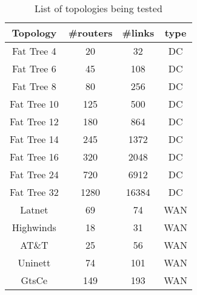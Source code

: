\begin{table}[h]
    \begin{tabular}{| c | c | c | c |}
    \hline
    Topology & \#routers & \#links & type \\
    \hline
    Fat Tree 4 & 20 & 32 & DC \\
    Fat Tree 6 & 45 & 108 & DC \\
    Fat Tree 8 & 80 & 256 & DC \\
    Fat Tree 10 & 125 & 500 & DC \\
    Fat Tree 12 & 180 & 864 & DC \\
    Fat Tree 14 & 245 & 1372 & DC \\
    Fat Tree 16 & 320 & 2048 & DC \\
    Fat Tree 24 & 720 & 6912 & DC \\
    Fat Tree 32 & 1280 & 16384 & DC \\
    Latnet & 69 & 74 & WAN \\
    Highwinds & 18 & 31 & WAN \\
    AT\&T & 25 & 56 & WAN \\
    Uninett & 74 & 101 & WAN \\
    GtsCe & 149 & 193 & WAN \\
    \hline
\end{tabular}
\caption{List of topologies being tested}
\label{tab:topologies}
\end{table}